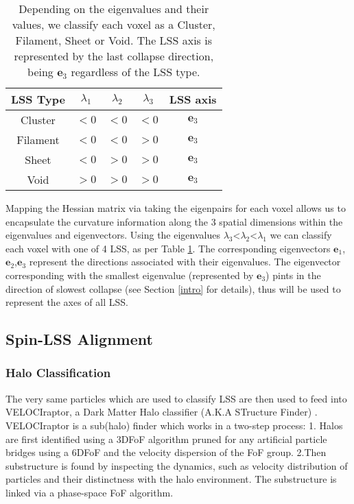 \documentclass[a4paper,fleqn,usenatbib]{mnras}
\begin{document}
\begin{table}
\centering
\begin{tabular}{|c|c|c|c|c|}
	\hline
	LSS Type & $\lambda_{1}$ & $\lambda_{2}$ & $\lambda_{3}$ & LSS axis\\
	\hline
    Cluster & $<0$ & $<0$ & $<0$ & $\textbf{e}_{3}$\\
	\hline
    Filament & $<0$ & $<0$ & $>0$ & $\textbf{e}_{3}$\\
	\hline
    Sheet & $<0$ & $>0$ & $>0$ & $\textbf{e}_{3}$\\
	\hline
    Void & $>0$ & $>0$ & $>0$ & $\textbf{e}_{3}$\\
	\hline   
    
\end{tabular}
\caption{\label{eigpairs}Depending on the eigenvalues and their values, we classify each voxel as a Cluster, Filament, Sheet or Void. The LSS axis is represented by the last collapse direction, being $\textbf{e}_{3}$ regardless of the LSS type.}
\end{table}

Mapping the Hessian matrix via taking the eigenpairs for each voxel allows us to encapsulate the curvature information along the 3 spatial dimensions within the eigenvalues and eigenvectors.
Using the eigenvalues $\lambda_{3}$<$\lambda_{2}$<$\lambda_{1}$ we can classify each voxel with one of 4 LSS, as per Table \ref{eigpairs}. The corresponding eigenvectors $\textbf{e}_{1}$,$\textbf{e}_{2}$,$\textbf{e}_{3}$ represent the directions associated with their eigenvalues. The eigenvector corresponding with the smallest eigenvalue (represented by $\textbf{e}_{3}$)  pints in the direction of slowest collapse (see Section \ref{intro} for details), thus will be used to represent the axes of all LSS.

\subsection{Spin-LSS Alignment}\label{alignment}

\subsubsection{Halo Classification}\label{halo_spin}
The very same particles which are used to classify LSS are then used to feed into VELOCIraptor, a Dark Matter Halo classifier (A.K.A STructure Finder) \citep{Elahi_11}. VELOCIraptor is a sub(halo) finder which works in a two-step process:
1. Halos are first identified using a  3DFoF algorithm pruned for any artificial particle bridges using a 6DFoF and the velocity dispersion of the FoF group.
2.Then substructure is found by inspecting the dynamics, such as velocity distribution of particles and their distinctness with the halo environment. The substructure is linked via a phase-space FoF algorithm. 
\end{document}

